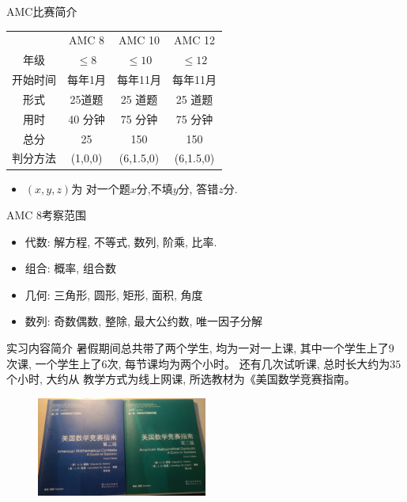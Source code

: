 \documentclass{beamer}
\theoremstyle{definition}
\begin{document}
\begin{frame}{AMC比赛简介}
    \begin{table}
        \centering
        \begin{tabular}{c|c|c|c}
            \hline
                     & AMC  8  & AMC 10    & AMC 12    \\
            年级     & $\le 8$ & $\le 10$  & $\le 12$  \\
            开始时间  &每年1月  & 每年11月 & 每年11月     \\
            形式     & 25道题  & 25 道题   & 25 道题   \\
            用时     & 40 分钟 & 75  分钟  & 75  分钟  \\
            总分     & 25      & 150       & 150       \\
            判分方法 & (1,0,0) & (6,1.5,0) & (6,1.5,0) \\
            \hline
        \end{tabular}
    \end{table}
    \begin{itemize}
        \item  $(x,y,z)$为 对一个题$x$分,不填$y$分, 答错$z$分.
    \end{itemize}
\end{frame}
\begin{frame}{AMC 8考察范围}
    \begin{itemize}
        \item 代数: 解方程, 不等式, 数列, 阶乘, 比率.
        \item 组合: 概率, 组合数
        \item 几何: 三角形, 圆形, 矩形, 面积, 角度
        \item 数列: 奇数偶数, 整除, 最大公约数, 唯一因子分解
    \end{itemize}
\end{frame}
\begin{frame}{实习内容简介}
    暑假期间总共带了两个学生, 均为一对一上课, 其中一个学生上了$9$次课, 一个学生上了$6$次, 每节课均为两个小时。
    还有几次试听课, 总时长大约为$35$个小时, 大约从
    教学方式为线上网课, 所选教材为《美国数学竞赛指南。
    \begin{figure}
        \centering
        \includegraphics[width=0.5\textwidth]{book.jpg}
    \end{figure}
\end{frame}
\end{document}
